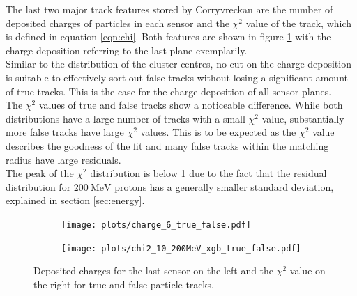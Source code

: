 The last two major track features stored by Corryvreckan are the number of deposited charges of particles in each sensor and the $\chi^2$ value of the track,
which is defined in equation \ref{eqn:chi}.
Both features are shown in figure \ref{fig:charge_chi} with the charge deposition referring to the last plane exemplarily. \\
Similar to the distribution of the cluster centres, no cut on the charge deposition is suitable to effectively sort out false tracks without losing a significant
amount of true tracks. This is the case for the charge deposition of all sensor planes. \\
The $\chi^2$ values of true and false tracks show a noticeable difference. While both distributions have a large number of tracks
with a small $\chi^2$ value, substantially more false tracks have large $\chi^2$ values. This is to be expected as the $\chi^2$ value describes the goodness of the fit and
many false tracks within the matching radius have large residuals. \\
The peak of the $\chi^2$ distribution is below 1 due to the fact that the residual distribution
for $\SI{200}{\mega\eV}$ protons has a generally smaller standard deviation, explained in section \ref{sec:energy}.

\begin{figure}
  \hspace{-0.4cm}
  \begin{subfigure}{0.51\textwidth}
      \centering
      \texttt{[image: plots/charge\_6\_true\_false.pdf]}
  \end{subfigure}
  \begin{subfigure}{0.51\textwidth}
      \hspace{-0.11cm}
      \texttt{[image: plots/chi2\_10\_200MeV\_xgb\_true\_false.pdf]}
  \end{subfigure}
  \caption{Deposited charges for the last sensor on the left and the $\chi^2$ value on the right for true and false particle tracks.}
  \label{fig:charge_chi}
\end{figure}



